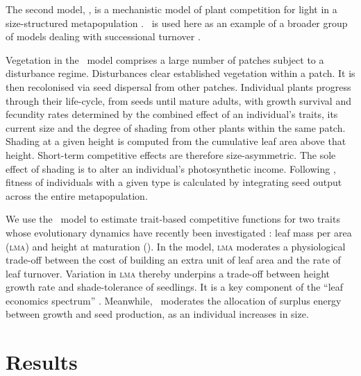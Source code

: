 \documentclass[a4paper,11pt]{article}
\begin{document}
The second model, \plant, is a mechanistic model of plant competition
for light in a size-structured metapopulation \citep{Falster-2011,
  Falster-2015}. \plant\ is used here as an example of a broader group
of models dealing with successional turnover
\citep{Huston-1987,Kohyama-1993,Moorcroft-2001,Falster-2011}.

Vegetation in the \plant\ model comprises a large number of patches subject
to a disturbance regime.  Disturbances clear established
vegetation within a patch. It is then recolonised via seed
dispersal from other patches.  Individual plants progress through
their life-cycle, from seeds until mature adults, with growth survival
and fecundity rates determined by the combined effect of an
individual's traits, its current size and the degree of shading from
other plants within the same patch. Shading at a given
height is computed from the cumulative leaf area above that height.
Short-term competitive effects are therefore size-asymmetric. The sole
effect of shading is to alter an individual's photosynthetic
income. Following \citep{Falster-2015}, fitness of individuals
with a given type is calculated by integrating seed output across the
entire metapopulation.

We use the \plant\ model to estimate trait-based competitive functions
for two traits whose evolutionary dynamics have recently been
investigated \citep{Falster-2015}: leaf mass per area (\textsc{lma})
and height at maturation (\hmat). In the model, \textsc{lma} moderates
a physiological trade-off between the cost of building an extra unit
of leaf area and the rate of leaf turnover.  Variation in \textsc{lma}
thereby underpins a trade-off between height growth rate and
shade-tolerance of seedlings. It is a key component of the
``leaf economics spectrum'' \citep{Wright-2004}. Meanwhile, \hmat\
moderates the allocation of surplus energy between growth and seed
production, as an individual increases in size.

\section{Results}

%

\subsection{\Rstar}
\end{document}
